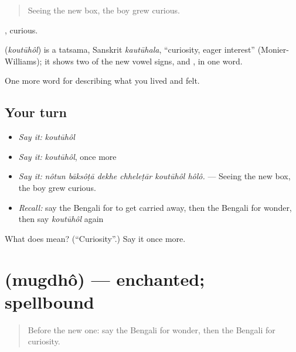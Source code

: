 \begin{quote}
Seeing the new box, the boy grew curious.
\end{quote}

, curious.

\begin{cousinweb}
\textbf{} (\emph{koutūhôl}) is a tatsama, Sanskrit \emph{kautūhala}, \textquotedblleft{}curiosity, eager interest\textquotedblright{} (Monier-Williams); it shows two of the new vowel signs,  and , in one word.
\end{cousinweb}

\begin{grammarlens}[title={What you've built}]
One more word for describing what you lived and felt.
\end{grammarlens}

\subsection*{Your turn}
\begin{itemize}
\raggedright
  \item \emph{Say it:} \emph{koutūhôl}
  \item \emph{Say it:} \emph{koutūhôl}, once more
  \item \emph{Say it:} \emph{nôtun bāksôṭā dekhe chheleṭār koutūhôl hôlô.} — Seeing the new box, the boy grew curious.
  \item \emph{Recall:} say the Bengali for to get carried away, then the Bengali for wonder, then say \emph{koutūhôl} again
\end{itemize}

\begin{tcolorbox}[breakable,colback=teal!4,colframe=teal!35!black,title={Before you move on}]
What does  mean? (\textquotedblleft{}Curiosity\textquotedblright{}.) Say it once more.
\end{tcolorbox}
\section[\texorpdfstring{\bn{মুগ্ধ} (mugdhô)}{মুগ্ধ (mugdhô)}]{ (mugdhô) — enchanted; spellbound}

\label{lesson:BN-C440-mugdho}



\begin{quote}
Before the new one: say the Bengali for wonder, then the Bengali for curiosity.
\end{quote}

